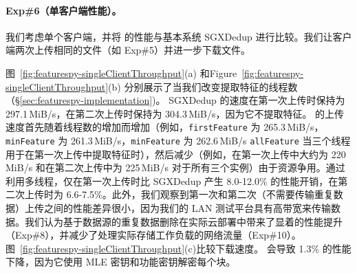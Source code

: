 \paragraph*{Exp\#6（单客户端性能）。}
我们考虑单个客户端，并将 \prototype 的性能与基本系统 SGXDedup 进行比较。我们让客户端两次上传相同的文件（如 Exp\#5）并进一步下载文件。


图~\ref{fig:featurespy-singleClientThroughput}(a) 和Figure~\ref{fig:featurespy-singleClientThroughput}(b) 分别展示了当我们改变提取特征的线程数（\S\ref{sec:featurespy-implementation})。 SGXDedup 的速度在第一次上传时保持为 297.1\,MiB/s，在第二次上传时保持为 304.3\,MiB/s，因为它不提取特征。 \prototype 的上传速度首先随着线程数的增加而增加（例如，{\tt firstFeature} 为 265.3\,MiB/s，{\tt minFeature} 为 261.3\,MiB/s，{\tt minFeature} 为 262.6\,MiB/s {\tt allFeature} 当三个线程用于在第一次上传中提取特征时），然后减少（例如，在第一次上传中大约为 220\,MiB/s 和在第二次上传中为 225\,MiB/s 对于所有三个实例）由于资源争用。通过利用多线程，\prototype 仅在第一次上传时比 SGXDedup 产生 8.0-12.0\% 的性能开销，在第二次上传时为 6.6-7.5\%。此外，我们观察到第一次和第二次（不需要传输重复数据）上传之间的性能差异很小，因为我们的 LAN 测试平台具有高带宽来传输数据。我们认为基于数据源的重复数据删除在实际云部署中带来了显着的性能提升（Exp\#8），并减少了处理实际存储工作负载的网络流量（Exp\#10）。图~\ref{fig:featurespy-singleClientThroughput}(c)比较下载速度。 \prototype 会导致 1.3\% 的性能下降，因为它使用 MLE 密钥和功能密钥解密每个块。


